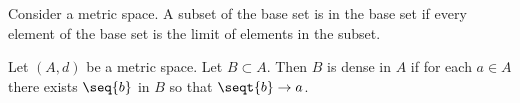 


Consider a metric space.
A subset of the base set is  in the base set if every element of the base set is the limit of elements in the subset.


Let $(A, d)$ be a metric space.
Let $B \subset A$.
Then $B$ is dense in $A$ if
for each $a \in A$ there exists
$\seq{b}$ in $B$ so that
$\seqt{b} \to a$.
